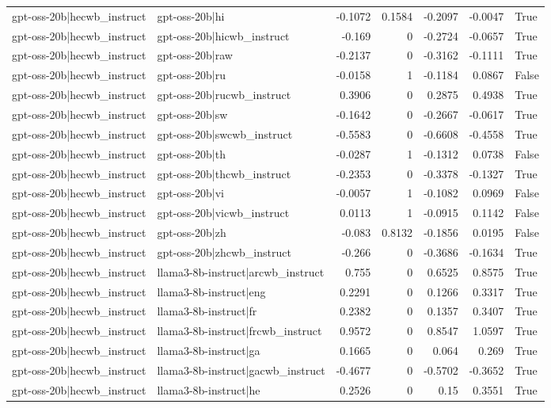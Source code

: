 \begin{table}
\begin{tabular}{l l r r r r l}
gpt-oss-20b|hecwb_instruct & gpt-oss-20b|hi & -0.1072 & 0.1584 & -0.2097 & -0.0047 & True \\
gpt-oss-20b|hecwb_instruct & gpt-oss-20b|hicwb_instruct & -0.169 & 0 & -0.2724 & -0.0657 & True \\
gpt-oss-20b|hecwb_instruct & gpt-oss-20b|raw & -0.2137 & 0 & -0.3162 & -0.1111 & True \\
gpt-oss-20b|hecwb_instruct & gpt-oss-20b|ru & -0.0158 & 1 & -0.1184 & 0.0867 & False \\
gpt-oss-20b|hecwb_instruct & gpt-oss-20b|rucwb_instruct & 0.3906 & 0 & 0.2875 & 0.4938 & True \\
gpt-oss-20b|hecwb_instruct & gpt-oss-20b|sw & -0.1642 & 0 & -0.2667 & -0.0617 & True \\
gpt-oss-20b|hecwb_instruct & gpt-oss-20b|swcwb_instruct & -0.5583 & 0 & -0.6608 & -0.4558 & True \\
gpt-oss-20b|hecwb_instruct & gpt-oss-20b|th & -0.0287 & 1 & -0.1312 & 0.0738 & False \\
gpt-oss-20b|hecwb_instruct & gpt-oss-20b|thcwb_instruct & -0.2353 & 0 & -0.3378 & -0.1327 & True \\
gpt-oss-20b|hecwb_instruct & gpt-oss-20b|vi & -0.0057 & 1 & -0.1082 & 0.0969 & False \\
gpt-oss-20b|hecwb_instruct & gpt-oss-20b|vicwb_instruct & 0.0113 & 1 & -0.0915 & 0.1142 & False \\
gpt-oss-20b|hecwb_instruct & gpt-oss-20b|zh & -0.083 & 0.8132 & -0.1856 & 0.0195 & False \\
gpt-oss-20b|hecwb_instruct & gpt-oss-20b|zhcwb_instruct & -0.266 & 0 & -0.3686 & -0.1634 & True \\
gpt-oss-20b|hecwb_instruct & llama3-8b-instruct|arcwb_instruct & 0.755 & 0 & 0.6525 & 0.8575 & True \\
gpt-oss-20b|hecwb_instruct & llama3-8b-instruct|eng & 0.2291 & 0 & 0.1266 & 0.3317 & True \\
gpt-oss-20b|hecwb_instruct & llama3-8b-instruct|fr & 0.2382 & 0 & 0.1357 & 0.3407 & True \\
gpt-oss-20b|hecwb_instruct & llama3-8b-instruct|frcwb_instruct & 0.9572 & 0 & 0.8547 & 1.0597 & True \\
gpt-oss-20b|hecwb_instruct & llama3-8b-instruct|ga & 0.1665 & 0 & 0.064 & 0.269 & True \\
gpt-oss-20b|hecwb_instruct & llama3-8b-instruct|gacwb_instruct & -0.4677 & 0 & -0.5702 & -0.3652 & True \\
gpt-oss-20b|hecwb_instruct & llama3-8b-instruct|he & 0.2526 & 0 & 0.15 & 0.3551 & True \\

\end{tabular}
\end{table}
